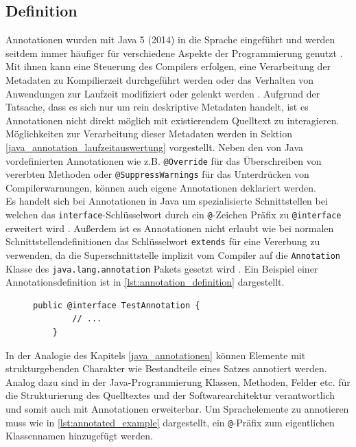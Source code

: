 \subsection{Definition}
\label{java_annotationen_definition}
\noindent Annotationen wurden mit Java 5 (2014) in die Sprache eingeführt und werden seitdem immer häufiger für verschiedene Aspekte der Programmierung genutzt \cite{Rocha2011}. Mit ihnen kann eine Steuerung des Compilers erfolgen, eine Verarbeitung der Metadaten zu Kompilierzeit durchgeführt werden oder das Verhalten von Anwendungen zur Laufzeit modifiziert oder gelenkt werden \cite{Yu2019}. Aufgrund der Tatsache, dass es sich nur um rein deskriptive Metadaten handelt, ist es Annotationen nicht direkt möglich mit existierendem Quelltext zu interagieren.  Möglichkeiten zur Verarbeitung dieser Metadaten werden in Sektion \ref{java_annotation_laufzeitauswertung} vorgestellt. Neben den von Java vordefinierten Annotationen wie z.B. \texttt{@Override} für das Überschreiben von vererbten Methoden oder \texttt{@SuppressWarnings} für das Unterdrücken von Compilerwarnungen, können auch eigene Annotationen deklariert werden.\\
Es handelt sich bei Annotationen in Java um spezialisierte Schnittstellen bei welchen das \texttt{interface}-Schlüsselwort durch ein \texttt{@}-Zeichen Präfix zu \texttt{@interface} erweitert wird \cite{Gosling2005}. Außerdem ist es Annotationen nicht erlaubt wie bei normalen Schnittstellendefinitionen das Schlüsselwort \texttt{extends} für eine Vererbung zu verwenden, da die Superschnittstelle implizit vom Compiler auf die \texttt{Annotation} Klasse des \texttt{java.lang.annotation} Pakets gesetzt wird \cite{Oracle2017}. Ein Beispiel einer  Annotationsdefinition ist in \autoref{lst:annotation_definition} dargestellt.
\begin{figure}[H]
	\centering
	\begin{lstlisting}[caption={Beispiel einer Annotationsdefinition.}, captionpos=b, label=lst:annotation_definition]
	public @interface TestAnnotation {
	    // ...
	}
	\end{lstlisting}
\end{figure}
\noindent In der Analogie des Kapitels \ref{java_annotationen} können Elemente mit strukturgebenden Charakter wie Bestandteile eines Satzes annotiert werden. Analog dazu sind in der Java-Programmierung Klassen, Methoden, Felder etc. für die Strukturierung des Quelltextes und der Softwarearchitektur verantwortlich und somit auch mit Annotationen erweiterbar. Um Sprachelemente zu annotieren muss wie in \autoref{lst:annotated_example} dargestellt, ein \texttt{@}-Präfix zum eigentlichen Klassennamen hinzugefügt werden.

